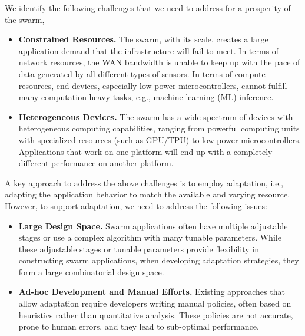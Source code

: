 \documentclass[thesis.tex]{subfiles}
\begin{document}
We identify the following challenges that we need to address for a prosperity of
the swarm,

\begin{itemize}[topsep=5pt, itemsep=2pt, leftmargin=10pt]

\item \textbf{Constrained Resources.} The swarm, with its scale, creates a large
  application demand that the infrastructure will fail to meet. In terms of
  network resources, the WAN bandwidth is unable to keep up with the pace of
  data generated by all different types of sensors. In terms of compute
  resources, end devices, especially low-power microcontrollers, cannot fulfill
  many computation-heavy tasks, e.g., machine learning (ML) inference.

\item \textbf{Heterogeneous Devices.} The swarm has a wide spectrum of devices
  with heterogeneous computing capabilities, ranging from powerful computing
  units with specialized resources (such as GPU/TPU) to low-power
  microcontrollers. Applications that work on one platform will end up with a
  completely different performance on another platform.

\end{itemize}

A key approach to address the above challenges is to employ adaptation, i.e.,
adapting the application behavior to match the available and varying
resource. However, to support adaptation, we need to address the following
issues:

\begin{itemize}[topsep=5pt, itemsep=2pt, leftmargin=10pt]

\item \textbf{Large Design Space.} Swarm applications often have multiple
  adjustable stages or use a complex algorithm with many tunable
  parameters. While these adjustable stages or tunable parameters provide
  flexibility in constructing swarm applications, when developing adaptation
  strategies, they form a large combinatorial design space.

\item \textbf{Ad-hoc Development and Manual Efforts.} Existing approaches that
  allow adaptation require developers writing manual policies, often based on
  heuristics rather than quantitative analysis. These policies are not accurate,
  prone to human errors, and they lead to sub-optimal performance.

\end{itemize}
\end{document}
